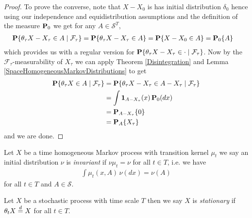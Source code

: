 \begin{proof}
To prove the converse, note that $X - X_0$ is has
initial distribution $\delta_0$ hence using our independence and
equidistribution assumptions and the definition of the measure
$\probabilityop_0$ we get for any $A \in \mathcal{S}^T$,
\begin{align*}
\cprobability{\mathcal{F}_\tau}{\theta_\tau X - X_\tau \in A} &=
\probability{\theta_\tau X - X_\tau \in A} 
=\probability{X - X_0 \in A} 
=\sprobability{A}{0}
\end{align*}
which provides us with a regular version for
$\cprobability{\mathcal{F}_\tau}{\theta_\tau X - X_\tau \in \cdot}$.
Now by the $\mathcal{F}_\tau$-measurability of $X_\tau$ we can apply
Theorem \ref{Disintegration} and Lemma
\ref{SpaceHomogeneousMarkovDistributions} to get
\begin{align*}
\cprobability{\mathcal{F}_\tau}{\theta_\tau X \in A}
&=\cprobability{\mathcal{F}_\tau}{\theta_\tau X - X_\tau \in A-X_\tau}\\
&= \int \characteristic{A-X_\tau}(x) \, \probabilityop_0(dx) \\
&=\sprobability{0}{A - X_\tau} \\
&=\sprobability{X_\tau}{A }
\end{align*}
and we are done.
\end{proof}

\begin{defn}Let $X$ be a time homogeneous Markov process with
  transition kernel $\mu_t$ we say an initial distribution $\nu$ is
  \emph{invariant} if $\nu \mu_t = \nu$ for all $t \in T$, i.e. we
  have
\begin{align*}
\int \mu_t(x, A) \, \nu(dx) = \nu(A)
\end{align*}
for all $t \in T$ and $A \in \mathcal{S}$.
\end{defn}

\begin{defn}Let $X$ be a stochastic process with time scale $T$ then
  we say $X$ is \emph{stationary} if $\theta_t X \eqdist X$
  for all $t \in T$.
\end{defn}


